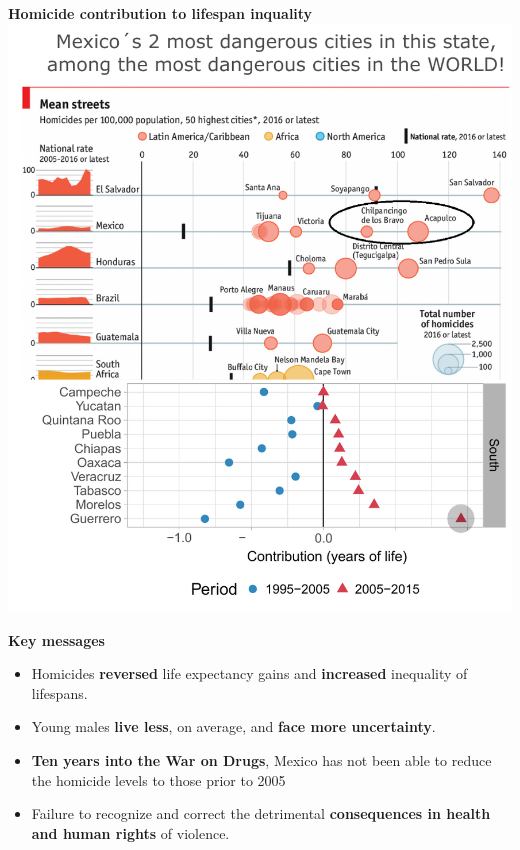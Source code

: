 \documentclass[xcolor={dvipsnames}]{beamer}
\begin{document}
\begin{frame}
	\begin{center}
			\Large{\textbf{Homicide contribution to lifespan inquality}}
		\includegraphics[scale=.47]{Figures/Figure_432}
	\end{center}
\end{frame}


\begin{frame}
\Large{
\textbf{Key messages} \pause

		\begin{itemize}
		
		\item Homicides \textbf{reversed} life expectancy gains and \textbf{increased} inequality of lifespans. \pause
		
		\item Young males \textbf{live less}, on average, and \textbf{face more uncertainty}.\pause
		
\item \textbf{Ten years into the War on Drugs}, Mexico has not been able to reduce the homicide levels to those prior to 2005 \pause
		
	    \item Failure to recognize and correct the detrimental \textbf{consequences in health and human rights} of 					violence.
							
		\end{itemize}

}
\end{frame}
\end{document}

